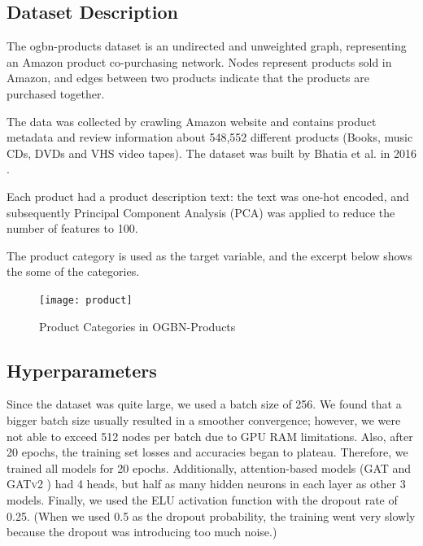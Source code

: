 \documentclass[sigconf, nonacm]{acmart}
\begin{document}
\subsection*{Dataset Description}
The ogbn-products dataset is an undirected and unweighted graph, representing an Amazon product co-purchasing network. Nodes represent products sold in Amazon, and edges between two products indicate that the products are purchased together.

The data was collected by crawling Amazon website and contains product metadata and review information about 548,552 different products (Books, music CDs, DVDs and VHS video tapes). The dataset was built by Bhatia et al. in 2016 \cite{Bhatia2016}.

Each product had a product description text: the text was one-hot encoded, and subsequently Principal Component Analysis (PCA) was applied to reduce the number of features to 100.

The product category is used as the target variable, and the excerpt below shows the some of the categories.
\begin{figure}[htp]
    \centering
    \texttt{[image: product]}
    \caption{Product Categories in OGBN-Products}
    \label{fig:galaxy}
\end{figure}
\subsection*{Hyperparameters}
Since the dataset was quite large, we used a batch size of 256. We found that a bigger batch size usually resulted in a smoother convergence; however, we were not able to exceed 512 nodes per batch due to GPU RAM limitations. Also, after 20 epochs, the training set losses and accuracies began to plateau. Therefore, we trained all models for 20 epochs. Additionally, attention-based models (\textsc{GAT} and \textsc{GATv2} )\cite{Brodyetal}\cite{Velickovic2017} had 4 heads, but half as many hidden neurons in each layer as other 3 models. Finally, we used the ELU activation function with the dropout rate of 0.25. (When we used 0.5 as the dropout probability, the training went very slowly because the dropout was introducing too much noise.)
\end{document}
